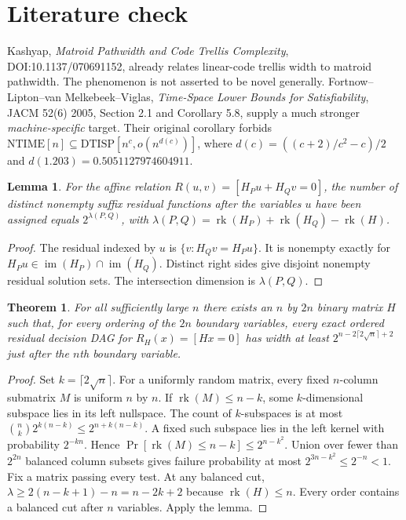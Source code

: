 \documentclass[11pt]{article}
\newtheorem{lemma}{Lemma}
\newtheorem{theorem}{Theorem}
\begin{document}
\section*{Literature check}
Kashyap, \emph{Matroid Pathwidth and Code Trellis Complexity}, DOI:10.1137/070691152, already relates linear-code trellis width to matroid pathwidth. The phenomenon is not asserted to be novel generally. Fortnow--Lipton--van Melkebeek--Viglas, \emph{Time-Space Lower Bounds for Satisfiability}, JACM 52(6) 2005, Section 2.1 and Corollary 5.8, supply a much stronger \emph{machine-specific} target. Their original corollary forbids $\mathrm{NTIME}[n]\subseteq\mathrm{DTISP}[n^c,o(n^{d(c)})]$, where $d(c)=((c+2)/c^2-c)/2$ and $d(1.203)=0.5051127974604911$.
\begin{lemma}
For the affine relation $R(u,v)=[H_Pu+H_Qv=0]$, the number of distinct nonempty suffix residual functions after the variables $u$ have been assigned equals $2^{\lambda(P,Q)}$, with $\lambda(P,Q)=\operatorname{rk}(H_P)+\operatorname{rk}(H_Q)-\operatorname{rk}(H)$.
\end{lemma}
\begin{proof}
The residual indexed by $u$ is $\{v:H_Qv=H_Pu\}$. It is nonempty exactly for $H_Pu\in\operatorname{im}(H_P)\cap\operatorname{im}(H_Q)$. Distinct right sides give disjoint nonempty residual solution sets. The intersection dimension is $\lambda(P,Q)$.
\end{proof}
\begin{theorem}
For all sufficiently large $n$ there exists an $n$ by $2n$ binary matrix $H$ such that, for every ordering of the $2n$ boundary variables, every exact ordered residual decision DAG for $R_H(x)=[Hx=0]$ has width at least $2^{n-2\lceil2\sqrt n\rceil+2}$ just after the $n$th boundary variable.
\end{theorem}
\begin{proof}
Set $k=\lceil2\sqrt n\rceil$. For a uniformly random matrix, every fixed $n$-column submatrix $M$ is uniform $n$ by $n$. If $\operatorname{rk}(M)\le n-k$, some $k$-dimensional subspace lies in its left nullspace. The count of $k$-subspaces is at most $\binom nk2^{k(n-k)}\le2^{n+k(n-k)}$. A fixed such subspace lies in the left kernel with probability $2^{-kn}$. Hence $\Pr[\operatorname{rk}(M)\le n-k]\le2^{n-k^2}$. Union over fewer than $2^{2n}$ balanced column subsets gives failure probability at most $2^{3n-k^2}\le2^{-n}<1$. Fix a matrix passing every test. At any balanced cut, $\lambda\ge 2(n-k+1)-n=n-2k+2$ because $\operatorname{rk}(H)\le n$. Every order contains a balanced cut after $n$ variables. Apply the lemma.
\end{proof}
\end{document}
